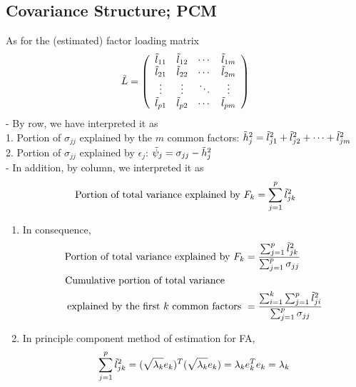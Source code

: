 \documentclass[12pt]{extarticle}
\newcommand{\<}{\langle}
\renewcommand{\>}{\rangle}
\theoremstyle{definition}
\begin{document}
\subsection{Covariance Structure; PCM}
As for the (estimated) factor loading matrix
\begin{align*}
    \Tilde{L}= \left(\begin{array}{cccc}
        \Tilde{l}_{11} & \Tilde{l}_{12} & \cdots & \Tilde{l}_{1m} \\
        \Tilde{l}_{21} & \Tilde{l}_{22} & \cdots & \Tilde{l}_{2m} \\
        \vdots & \vdots & \ddots & \vdots \\
        \Tilde{l}_{p1} & \Tilde{l}_{p2} & \cdots & \Tilde{l}_{pm}
        \end{array} \right)
\end{align*}
 - By row, we have interpreted it as\\
 1. Portion of $\sigma_{jj}$ explained by the $m$ common factors: $\Tilde{h}^2_j = \Tilde{l}^2_{j1}+\Tilde{l}^2_{j2}+\cdots+\Tilde{l}^2_{jm}$\\
 2. Portion of $\sigma_{jj}$ explained by $\epsilon_j$: $\Tilde{\psi}_j =\sigma_{jj} -\Tilde{h}^2_j$\\
 
 - In addition, by column, we interpreted it as
 \begin{align*}
     \text{Portion of total variance explained by } F_k=\sum^p_{j=1} \Tilde{l}^2_{jk}
 \end{align*}
\begin{enumerate}
    \item In consequence,
    \begin{align*}
        \text{Portion of total variance explained by } F_k &= \frac{\sum^p_{j=1} \Tilde{l}^2_{jk}}{\sum^p_{j=1} \sigma_{jj}}\\
        \text{Cumulative portion of total variance} \qquad &\\
        \text{explained by the first $k$ common factors } &= \frac{\sum^k_{i=1}\sum^p_{j=1}\Tilde{l}^2_{ji}}{\sum^p_{j=1}\sigma_{jj}}
    \end{align*}
    \item In principle component method of estimation for FA,
    \begin{align*}
        \sum^p_{j=1} \Tilde{l}^2_{jk} = (\sqrt{\lambda_k}e_k)^T (\sqrt{\lambda_k}e_k) = \lambda_k e_k^T e_k = \lambda_k
    \end{align*}
\end{enumerate}
\end{document}
